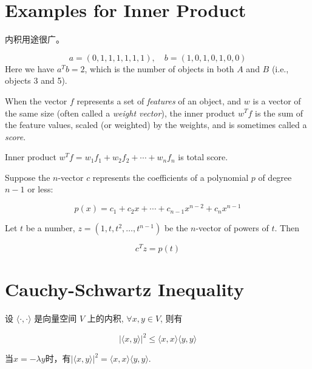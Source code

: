 \section{Examples for Inner Product}

内积用途很广。

\begin{example}[计算同时出现的项目数]
   $$
a=(0,1,1,1,1,1,1), \quad b=(1,0,1,0,1,0,0)
$$
Here we have $ a^{T} b=2 $, which is the number of objects in both $ A $ and $ B $ (i.e., objects 3 and 5). 
\end{example}

\begin{example}
    When the vector $f$ represents a set of \textit{features} of
    an object, and $w$ is a vector of the same size (often called a \textit{weight vector}), the
    inner product $w^T f$ is the sum of the feature values, scaled (or weighted) by
    the weights, and is sometimes called a \textit{score}.

    Inner product $ w^{T} f=w_{1} f_{1}+w_{2} f_{2}+\cdots+w_{n} f_{n} $ is total score. 

\end{example}

\begin{example}[多项式]
    Suppose the $ n $-vector $ c $ represents the coefficients of a polynomial $ p $ of degree $ n-1 $ or less:

    $$ p(x)=c_{1}+c_{2} x+\cdots+c_{n-1} x^{n-2}+c_{n} x^{n-1} $$

    Let $t$ be a number, $ z=\left(1, t, t^{2}, \ldots, t^{n-1}\right) $  be the $n$-vector of powers
    of $t$. Then

    $$ c^{T} z=p(t) $$
\end{example}


\section{Cauchy-Schwartz Inequality}
\begin{theorem}
    \label{thm:cauchy-schwartz=inequality}
    设 \( \langle \cdot,\cdot \rangle \) 是向量空间 \( V \) 上的内积, \( \forall x, y \in V \), 则有

    $$
|\langle x, y\rangle|^{2} \leq\langle x, x\rangle\langle y, y\rangle
$$

    当$x=-\lambda y$时，有$|\langle x, y\rangle|^{2}=\langle x, x\rangle\langle y, y\rangle$.
\end{theorem}


